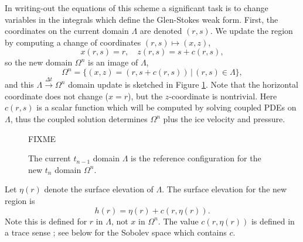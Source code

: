 \documentclass[letterpaper,final,12pt,reqno]{amsart}
\begin{document}
In writing-out the equations of this scheme a significant task is to change variables in the integrals which define the Glen-Stokes weak form.  First, the coordinates on the current domain $\Lambda$ are denoted $(r,s)$.  We update the region by computing a change of coordinates $(r,s) \mapsto (x,z)$,
\begin{equation}
x(r,s)=r, \quad z(r,s)=s+c(r,s), \label{changecoords}
\end{equation}
so the new domain $\Omega^n$ is an image of $\Lambda$,
\begin{equation}
\Omega^n = \{(x,z)=(r,s+c(r,s)) \,\big|\, (r,s) \in \Lambda\}, \label{updateddomain}
\end{equation}
and this $\Lambda \stackrel{\Delta t}{\to} \Omega^n$ domain update is sketched in Figure \ref{fig:domainupdate}.  Note that the horizontal coordinate does not change ($x=r$), but the $z$-coordinate is nontrivial.  Here $c(r,s)$ is a scalar function which will be computed by solving coupled PDEs on $\Lambda$, thus the coupled solution determines $\Omega^n$ plus the ice velocity and pressure.

\begin{figure}[h]
FIXME

\caption{The current $t_{n-1}$ domain $\Lambda$ is the reference configuration for the new $t_n$ domain $\Omega^n$.}
\label{fig:domainupdate}
\end{figure}

Let $\eta(r)$ denote the surface elevation of $\Lambda$.  The surface elevation for the new region is
\begin{equation}
h(r) = \eta(r) + c(r,\eta(r)).  \label{newsurfaceelevation}
\end{equation}
Note this is defined for $r$ in $\Lambda$, not $x$ in $\Omega^n$.  The value $c(r,\eta(r))$ is defined in a trace sense \cite{Evans2010}; see below for the Sobolev space which contains $c$.
\end{document}
